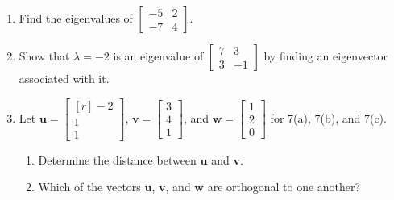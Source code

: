 \documentclass[basic]{inVerba-notes}
\begin{document}
\begin{enumerate}[align=left, leftmargin=0pt, labelindent=\parindent, listparindent=\parindent, labelwidth=0pt, itemindent=!]
  \item {} Find the eigenvalues of \(\begin{bmatrix}-5 & 2\\-7 & 4\end{bmatrix}\).
  
  \newpage

  \item {} Show that \(\lambda=-2\) is an eigenvalue of \(\begin{bmatrix}7 & 3\\3 & -1\end{bmatrix}\) by finding an eigenvector associated with it.
  

  \item {} Let \(\bm{u}=\begin{bmatrix*}[r] -2 \\ 1 \\ 1 \end{bmatrix*}\),  \(\bm{v}=\begin{bmatrix} 3 \\ 4 \\ 1 \end{bmatrix}\), and \(\bm{w}=\begin{bmatrix} 1 \\ 2\\ 0 \end{bmatrix}\) for 7(a), 7(b), and 7(c).
  
    \begin{enumerate}
      \item {} Determine the distance between \(\bm{u}\) and \(\bm{v}\).
      
      \item {} Which of the vectors \(\bm{u}\), \(\bm{v}\), and \(\bm{w}\) are orthogonal to one another?
      \vfill
      
      \newpage
      

\end{enumerate}
\end{enumerate}
\end{document}
